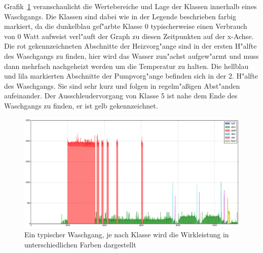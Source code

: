 Grafik~\ref{typWasch} veranschaulicht die Wertebereiche und Lage der Klassen innerhalb eines Waschgangs. Die Klassen sind dabei wie in der Legende beschrieben farbig markiert, da die dunkelblau  gef"arbte Klasse 0 typischerweise einen Verbrauch von 0 Watt aufweist verl"auft der Graph zu diesen Zeitpunkten auf der x-Achse. Die rot gekennzeichneten Abschnitte der Heizvorg"ange sind in der ersten H"alfte des Waschgangs zu finden, hier wird das Wasser zun"achst aufgew"armt und muss dann mehrfach nachgeheizt werden um die Temperatur zu halten. Die hellblau und lila markierten Abschnitte der Pumpvorg"ange befinden sich in der 2. H"alfte des Waschgangs. Sie sind sehr kurz und folgen in regelm"a{\ss}igen Abst"anden aufeinander. Der Ausschleudervorgang von Klasse 5 ist nahe dem Ende des Waschgangs zu finden, er ist gelb gekennzeichnet.
\begin{figure}[ht]
\includegraphics[height=0.7\textwidth , angle=90]{1_Grafiken/classes0.png}
	\caption[Typischer Waschgang, farbig annotiert]{Ein typischer Waschgang, je nach Klasse wird die Wirkleistung in unterschiedlichen Farben dargestellt}
\label{typWasch}
\end{figure}
